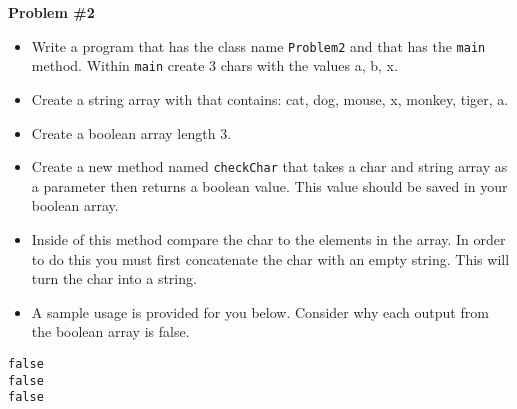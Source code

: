 \documentclass[12pt]{article}
\begin{document}
\vspace*{0.5cm}
\noindent\textbf{Problem \#2}
\begin{itemize}
	\item Write a program that has the class name \texttt{Problem2} and that has the \texttt{main} method. Within \texttt{main} create 3 chars with the values a, b, x.
	\item Create a string array with that contains: cat, dog, mouse, x, monkey, tiger, a.
	\item Create a boolean array length 3.
	\item Create a new method named \texttt{checkChar} that takes a char and string array as a parameter then returns a boolean value. This value should be saved in your boolean array.
	\item Inside of this method compare the char to the elements in the array. In order to do this you must first concatenate the char with an empty string. This will turn the char into a string. 
	\item A sample usage is provided for you below. Consider why each output from the boolean array is false. 
\end{itemize}
\begin{center}
\vspace{.10cm}
\begin{minipage}{5.6cm}
\begin{lstlisting}[escapechar=$]
false
false
false
\end{lstlisting}
\end{minipage}
\end{center}
\end{document}
